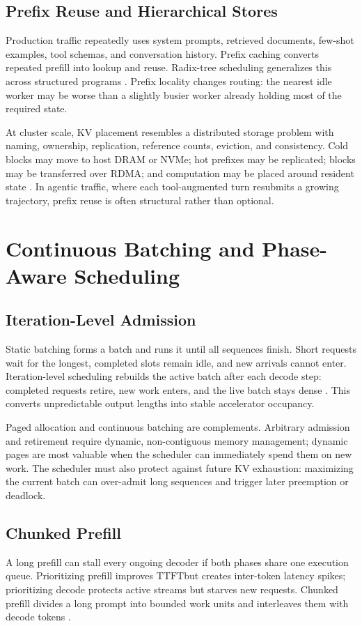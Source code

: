 \documentclass[journal]{IEEEtran}
\newcommand{\TTFT}{\ensuremath{\mathrm{TTFT}}}
\begin{document}
\subsection{Prefix Reuse and Hierarchical Stores}
Production traffic repeatedly uses system prompts, retrieved documents, few-shot examples, tool schemas, and conversation history. Prefix caching converts repeated prefill into lookup and reuse. Radix-tree scheduling generalizes this across structured programs \cite{zheng2024sglang}. Prefix locality changes routing: the nearest idle worker may be worse than a slightly busier worker already holding most of the required state.

At cluster scale, KV placement resembles a distributed storage problem with naming, ownership, replication, reference counts, eviction, and consistency. Cold blocks may move to host DRAM or NVMe; hot prefixes may be replicated; blocks may be transferred over RDMA; and computation may be placed around resident state \cite{sheng2023flexgen,qin2025mooncake}. In agentic traffic, where each tool-augmented turn resubmits a growing trajectory, prefix reuse is often structural rather than optional.

\section{Continuous Batching and Phase-Aware Scheduling}
\subsection{Iteration-Level Admission}
Static batching forms a batch and runs it until all sequences finish. Short requests wait for the longest, completed slots remain idle, and new arrivals cannot enter. Iteration-level scheduling rebuilds the active batch after each decode step: completed requests retire, new work enters, and the live batch stays dense \cite{yu2022orca}. This converts unpredictable output lengths into stable accelerator occupancy.

Paged allocation and continuous batching are complements. Arbitrary admission and retirement require dynamic, non-contiguous memory management; dynamic pages are most valuable when the scheduler can immediately spend them on new work. The scheduler must also protect against future KV exhaustion: maximizing the current batch can over-admit long sequences and trigger later preemption or deadlock.

\subsection{Chunked Prefill}
A long prefill can stall every ongoing decoder if both phases share one execution queue. Prioritizing prefill improves \TTFT but creates inter-token latency spikes; prioritizing decode protects active streams but starves new requests. Chunked prefill divides a long prompt into bounded work units and interleaves them with decode tokens \cite{agrawal2024sarathi}.
\end{document}
